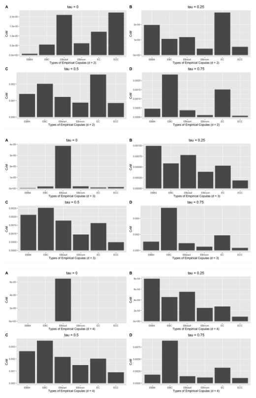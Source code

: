 \documentclass[12pt]{report}
\newcommand{\1}{\mathbf{1}}
\begin{document}
\begin{flushleft}
\begin{center}
\label{G_2d_s_CvM}
\includegraphics[width=17cm]{ExceedanceCvM/G_2d_s_CvM.png}
\end{center}%

\begin{center}
\label{G_3d_s_CvM}
\includegraphics[width=17cm]{ExceedanceCvM/G_3d_s_CvM.png}
\end{center}%

\begin{center}
\label{G_4d_s_CvM}
\includegraphics[width=17cm]{ExceedanceCvM/G_4d_s_CvM.png}
\end{center}%


\end{flushleft}
\end{document}
